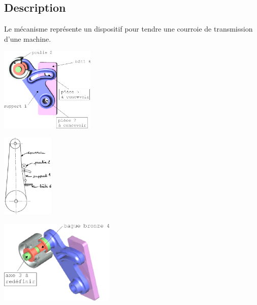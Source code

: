 \documentclass[11pt,oneside]{article}
\begin{document}
\subsection*{Description}

Le mécanisme représente un dispositif pour tendre une courroie de transmission d’une machine. 

\begin{minipage}[c]{.3\linewidth}
\begin{center}
\includegraphics[height=4cm]{png/fig1}

\end{center}
\end{minipage}\hfill
\begin{minipage}[c]{.3\linewidth}
\begin{center}
\includegraphics[height=4cm]{png/fig2}

\end{center}
\end{minipage}\hfill
\begin{minipage}[c]{.3\linewidth}
\begin{center}
\includegraphics[height=4cm]{png/fig3}

\end{center}
\end{minipage}
\end{document}
